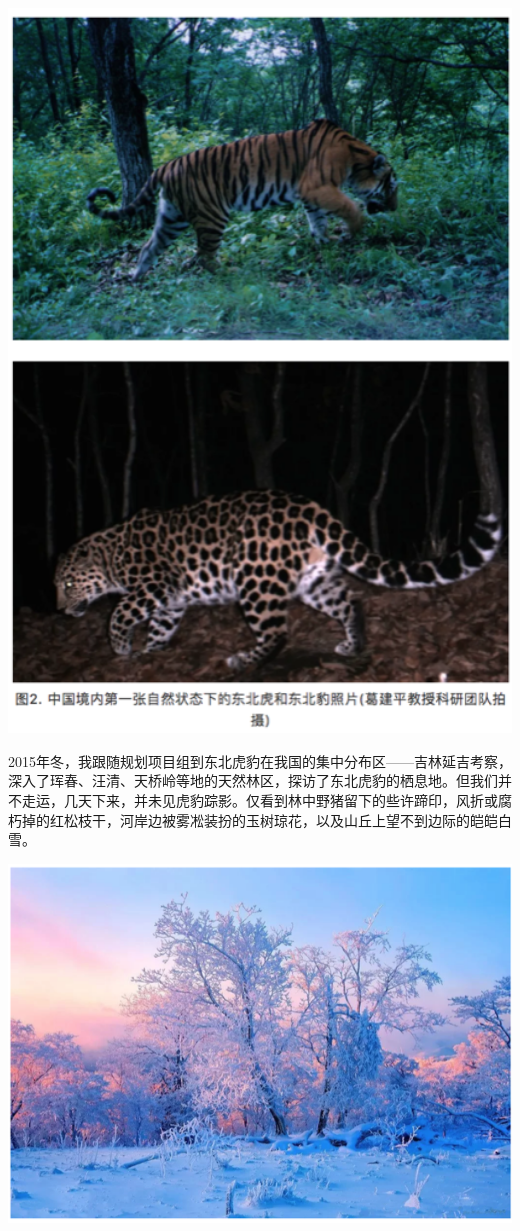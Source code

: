 \documentclass[]{book}
\begin{document}
\includegraphics[width=5.79in]{images/tiger2}

2015年冬，我跟随规划项目组到东北虎豹在我国的集中分布区------吉林延吉考察，深入了珲春、汪清、天桥岭等地的天然林区，探访了东北虎豹的栖息地。但我们并不走运，几天下来，并未见虎豹踪影。仅看到林中野猪留下的些许蹄印，风折或腐朽掉的红松枝干，河岸边被雾凇装扮的玉树琼花，以及山丘上望不到边际的皑皑白雪。

\includegraphics[width=8.33in]{images/tiger3}
\end{document}

